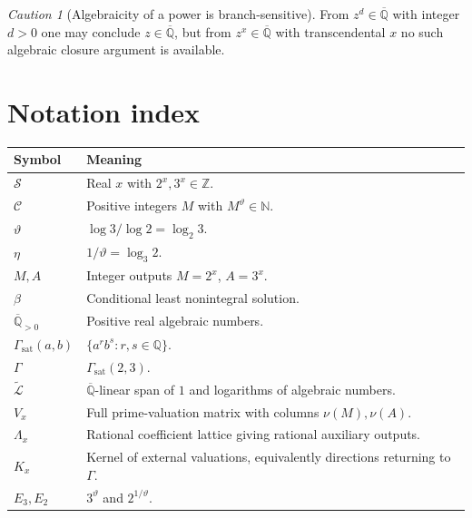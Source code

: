 \documentclass[11pt,oneside]{article}
\theoremstyle{definition}
\theoremstyle{remark}
\newtheorem{warning}[theorem]{Caution}
\newcommand{\N}{\mathbb N}
\newcommand{\Z}{\mathbb Z}
\newcommand{\Q}{\mathbb Q}
\newcommand{\Qbar}{\overline{\mathbb Q}}
\newcommand{\Apos}{\overline{\mathbb Q}_{>0}}
\newcommand{\Sol}{\mathcal S}
\newcommand{\Cand}{\mathcal C}
\newcommand{\GammaSat}{\Gamma_{\mathrm{sat}}}
\newcommand{\LL}{\widetilde{\mathcal L}}
\begin{document}
\begin{warning}[Algebraicity of a power is branch-sensitive]
From $z^d\in\Qbar$ with integer $d>0$ one may conclude $z\in\Qbar$, but from
$z^x\in\Qbar$ with transcendental $x$ no such algebraic closure argument is available.
\end{warning}

\section{Notation index}

\begin{longtable}{p{}p{}}
\toprule
Symbol & Meaning \\
\midrule
\endhead
$\Sol$ & Real $x$ with $2^x,3^x\in\Z$. \\
$\Cand$ & Positive integers $M$ with $M^{\vartheta}\in\N$. \\
$\vartheta$ & $\log3/\log2=\log_2 3$. \\
$\eta$ & $1/\vartheta=\log_3 2$. \\
$M,A$ & Integer outputs $M=2^x$, $A=3^x$. \\
$\beta$ & Conditional least nonintegral solution. \\
$\Apos$ & Positive real algebraic numbers. \\
$\GammaSat(a,b)$ & $\{a^rb^s:r,s\in\Q\}$. \\
$\Gamma$ & $\GammaSat(2,3)$. \\
$\LL$ & $\Qbar$-linear span of $1$ and logarithms of algebraic numbers. \\
$V_x$ & Full prime-valuation matrix with columns $\nu(M),\nu(A)$. \\
$\Lambda_x$ & Rational coefficient lattice giving rational auxiliary outputs. \\
$K_x$ & Kernel of external valuations, equivalently directions returning to $\Gamma$. \\
$E_3,E_2$ & $3^{\vartheta}$ and $2^{1/\vartheta}$. \\
\bottomrule
\end{longtable}
\end{document}
